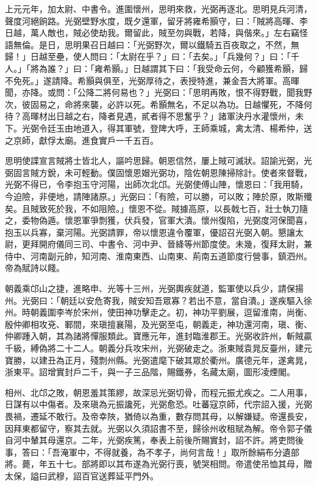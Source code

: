 \begin{pinyinscope}
 上元元年，加太尉、中書令。進圍懷州，思明來救，光弼再逐北。思明見兵河清，聲度河絕餉路。光弼壁野水度，既夕還軍，留牙將雍希顥守，曰：「賊將高暉、李日越，萬人敵也，賊必使劫我。爾留此，賊至勿與戰，若降，與偕來。」左右竊怪語無倫。是日，思明果召日越曰：「光弼野次，爾以鐵騎五百夜取之，不然，無歸！」日越至壘，使人問曰：「太尉在乎？」曰：「去矣。」「兵幾何？」曰：「千人。」「將為誰？」曰：「雍希顥。」日越謂其下曰：「我受命云何，今顧獲希顥，歸不免死。」遂請降。希顥與俱至，光弼厚待之，表授特進，兼金吾大將軍。高暉聞，亦降。或問：「公降二將何易也？」光弼曰：「思明再敗，恨不得野戰，聞我野次，彼固易之，命將來襲，必許以死。希顥無名，不足以為功。日越懼死，不降何待？高暉材出日越之右，降者見遇，貳者得不思奮乎？」諸軍決丹水灌懷州，未下。光弼令廷玉由地道入，得其軍號，登陴大呼，王師乘城，禽太清、楊希仲，送之京師，獻俘太廟。進食實戶一千五百。



 思明使諜宣言賊將士皆北人，謳吟思歸。朝恩信然，屢上賊可滅狀。詔諭光弼，光弼固言賊方銳，未可輕動。僕固懷恩媢光弼功，陰佐朝恩陳掃除計。使者來督戰，光弼不得已，令李抱玉守河陽，出師次北邙。光弼使傅山陣，懷恩曰：「我用騎，今迫險，非便地，請陣諸原。」光弼曰：「有險，可以勝，可以敗；陣於原，敗斯殲矣。且賊致死於我，不如阻險。」懷恩不從。賊據高原，以長戟七百，壯士執刀隨之，委物偽遁。懷恩軍爭剽獲，伏兵發，官軍大潰。懷州復陷，光弼度河保聞喜，抱玉以兵寡，棄河陽。光弼請罪，帝以懷恩違令覆軍，優詔召光弼入朝。懇讓太尉，更拜開府儀同三司、中書令、河中尹、晉絳等州節度使。未幾，復拜太尉，兼侍中、河南副元帥，知河南、淮南東西、山南東、荊南五道節度行營事，鎮泗州。帝為賦詩以餞。



 朝義乘邙山之捷，進略申、光等十三州，光弼輿疾就道，監軍使以兵少，請保揚州。光弼曰：「朝廷以安危寄我，賊安知吾眾寡？若出不意，當自潰。」遂疾驅入徐州。時朝義圍李岑於宋州，使田神功擊走之。初，神功平劉展，逗留淮南，尚衡、殷仲卿相攻兗、鄆間，來瑱擅襄陽，及光弼至屯，朝義走，神功還河南，瑱、衡、仲卿踵入朝，其為諸將憚服類此。寶應元年，進封臨淮郡王。光弼收許州，斬賊贏千級，縛偽將二十二人。朝義分兵攻宋州，光弼破走之。浙東賊袁晁反臺州，建元寶勝，以建丑為正月，殘剽州縣。光弼遣麾下破其眾於衢州。廣德元年，遂禽晁，浙東平。詔增實封戶二千，與一子三品階，賜鐵券，名藏太廟，圖形凌煙閣。



 相州、北邙之敗，朝恩羞其策繆，故深忌光弼切骨，而程元振尤疾之。二人用事，日謀有以中傷者。及來瑱為元振讒死，光弼愈恐。吐蕃寇京師，代宗詔入援，光弼畏禍，遷延不敢行。及帝幸陜，猶倚以為重，數存問其母，以解嫌疑。帝還長安，因拜東都留守，察其去就。光弼以久須詔書不至，歸徐州收租賦為解。帝令郭子儀自河中輦其母還京。二年，光弼疾篤，奉表上前後所賜實封，詔不許。將吏問後事，答曰：「吾淹軍中，不得就養，為不孝子，尚何言哉！」取所餘絹布分遺部將。薨，年五十七。部將即以其布遂為光弼行喪，號哭相問。帝遣使吊恤其母，贈太保，謚曰武穆，詔百官送葬延平門外。




\end{pinyinscope}

